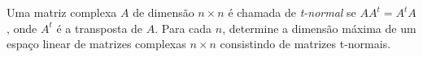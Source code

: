 Uma matriz complexa \(A\) de dimensão \(n \times n\) é chamada de \emph{t-normal} se \(AA^t = A^t A\), onde \(A^t\) é a transposta de \(A\). Para cada \(n\), determine a dimensão máxima de um espaço linear de matrizes complexas \(n \times n\) consistindo de matrizes t-normais.
